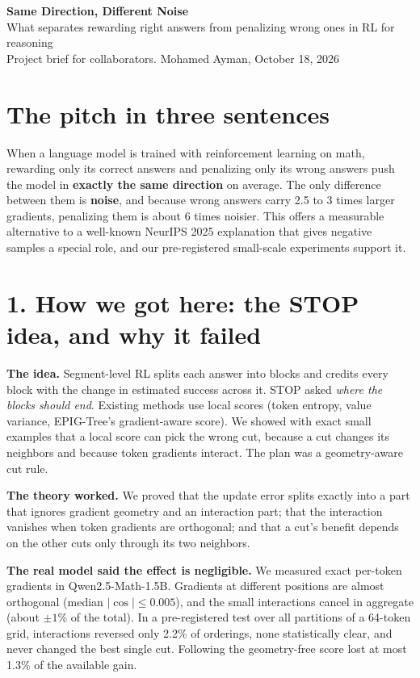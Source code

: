 \documentclass[11pt]{article}
\begin{document}
\begin{center}
{\LARGE\bfseries Same Direction, Different Noise}\\[6pt]
{\large What separates rewarding right answers from penalizing wrong ones in RL for reasoning}\\[6pt]
{\small Project brief for collaborators. Mohamed Ayman, October 18, 2026}
\end{center}

\section*{The pitch in three sentences}
When a language model is trained with reinforcement learning on math, rewarding only its correct answers and penalizing only its wrong answers push the model in \textbf{exactly the same direction} on average. The only difference between them is \textbf{noise}, and because wrong answers carry 2.5 to 3 times larger gradients, penalizing them is about 6 times noisier. This offers a measurable alternative to a well-known NeurIPS 2025 explanation that gives negative samples a special role, and our pre-registered small-scale experiments support it.

\section*{1. How we got here: the STOP idea, and why it failed}

\textbf{The idea.} Segment-level RL splits each answer into blocks and credits every block with the change in estimated success across it. STOP asked \emph{where the blocks should end}. Existing methods use local scores (token entropy, value variance, EPIG-Tree's gradient-aware score). We showed with exact small examples that a local score can pick the wrong cut, because a cut changes its neighbors and because token gradients interact. The plan was a geometry-aware cut rule.

\textbf{The theory worked.} We proved that the update error splits exactly into a part that ignores gradient geometry and an interaction part; that the interaction vanishes when token gradients are orthogonal; and that a cut's benefit depends on the other cuts only through its two neighbors.

\textbf{The real model said the effect is negligible.} We measured exact per-token gradients in Qwen2.5-Math-1.5B. Gradients at different positions are almost orthogonal (median $|\cos|\le0.005$), and the small interactions cancel in aggregate (about $\pm1\%$ of the total). In a pre-registered test over all partitions of a 64-token grid, interactions reversed only 2.2\% of orderings, none statistically clear, and never changed the best single cut. Following the geometry-free score lost at most 1.3\% of the available gain.
\end{document}
